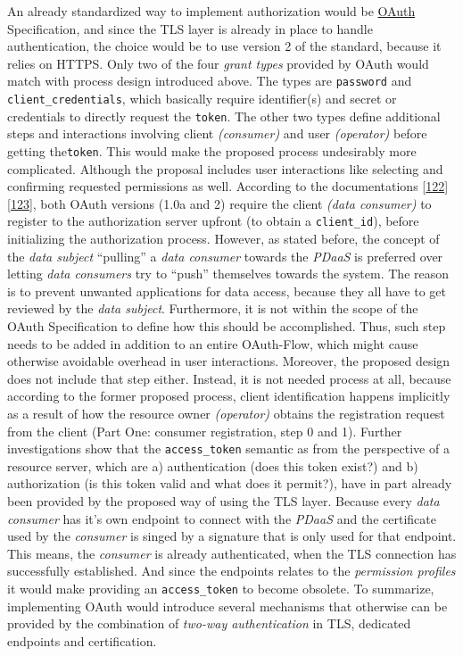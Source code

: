 \documentclass[12pt,english,a4paper,titlepage,cleardoublepage=empty,dottedtoc]{report}
\begin{document}
An already standardized way to implement authorization would be
\protect\hyperlink{link_oauth}{OAuth} Specification, and since the TLS
layer is already in place to handle authentication, the choice would be
to use version 2 of the standard, because it relies on HTTPS. Only two
of the four \emph{grant types} provided by OAuth would match with
process design introduced above. The types are \texttt{password} and
\texttt{client\_credentials}, which basically require identifier(s) and
secret or credentials to directly request the \texttt{token}. The other
two types define additional steps and interactions involving client
\emph{(consumer)} and user \emph{(operator)} before getting
the\texttt{token}. This would make the proposed process undesirably more
complicated. Although the proposal includes user interactions like
selecting and confirming requested permissions as well. According to the
documentations
{[}\protect\hyperlink{ref-web_spec_oauth-1a_client-reg}{122}{]}
{[}\protect\hyperlink{ref-web_spec_oauth-2_client-reg}{123}{]}, both
OAuth versions (1.0a and 2) require the client \emph{(data consumer)} to
register to the authorization server upfront (to obtain a
\texttt{client\_id}), before initializing the authorization process.
However, as stated before, the concept of the \emph{data subject}
``pulling'' a \emph{data consumer} towards the \emph{PDaaS} is preferred
over letting \emph{data consumers} try to ``push'' themselves towards
the system. The reason is to prevent unwanted applications for data
access, because they all have to get reviewed by the \emph{data
subject}. Furthermore, it is not within the scope of the OAuth
Specification to define how this should be accomplished. Thus, such step
needs to be added in addition to an entire OAuth-Flow, which might cause
otherwise avoidable overhead in user interactions. Moreover, the
proposed design does not include that step either. Instead, it is not
needed process at all, because according to the former proposed process,
client identification happens implicitly as a result of how the resource
owner \emph{(operator)} obtains the registration request from the client
(Part One: consumer registration, step 0 and 1). Further investigations
show that the \texttt{access\_token} semantic as from the perspective of
a resource server, which are a) authentication (does this token exist?)
and b) authorization (is this token valid and what does it permit?),
have in part already been provided by the proposed way of using the TLS
layer. Because every \emph{data consumer} has it's own endpoint to
connect with the \emph{PDaaS} and the certificate used by the
\emph{consumer} is singed by a signature that is only used for that
endpoint. This means, the \emph{consumer} is already authenticated, when
the TLS connection has successfully established. And since the endpoints
relates to the \emph{permission profiles} it would make providing an
\texttt{access\_token} to become obsolete. To summarize, implementing
OAuth would introduce several mechanisms that otherwise can be provided
by the combination of \emph{two-way authentication} in TLS, dedicated
endpoints and certification.
\end{document}
